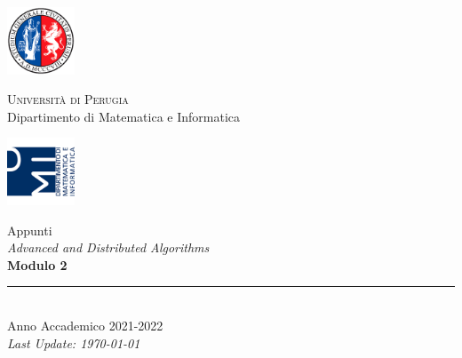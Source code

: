 
\thispagestyle{empty} %

\noindent %
\includegraphics[width=0.15\textwidth]{frontmatter/imgs/logoUniPg.jpg}
\begin{minipage}[b]{0.7\textwidth}
    \centering
    {\Large \textsc{Universit{\`a} di Perugia}}\\
    \vspace{0.4 em}
    {\large Dipartimento di Matematica e Informatica}
    \vspace{0.6 em}
\end{minipage}%
\includegraphics[width=0.15\textwidth]{frontmatter/imgs/logoDMI.jpg}

\vspace{8 em}

\begin{center}
    {\Huge Appunti}\\
    \vspace{1 em}
    {\Huge \textit{Advanced and Distributed Algorithms}}\\
    \vspace{5 em}
    {\Huge \textbf{Modulo 2}}\\

    \vfill

    \rule{380pt}{.4pt}\\
    \vspace{1.2 em}
    \large{Anno Accademico 2021-2022}\\ %
    \vspace{.9 em}
    \small{\textit{Last Update: \today{}}}
\end{center}

